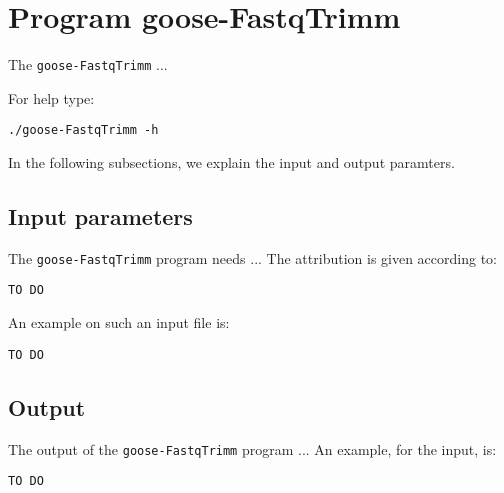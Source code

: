 \section{Program goose-FastqTrimm}
The \texttt{goose-FastqTrimm} ...

For help type:
\begin{lstlisting}
./goose-FastqTrimm -h
\end{lstlisting}
In the following subsections, we explain the input and output paramters.

\subsection{Input parameters}

The \texttt{goose-FastqTrimm} program needs ...
The attribution is given according to:
\begin{lstlisting}
TO DO
\end{lstlisting}

An example on such an input file is:
\begin{lstlisting}
TO DO
\end{lstlisting}

\subsection{Output}
The output of the \texttt{goose-FastqTrimm} program ...
An example, for the input, is:
\begin{lstlisting}
TO DO
\end{lstlisting}
